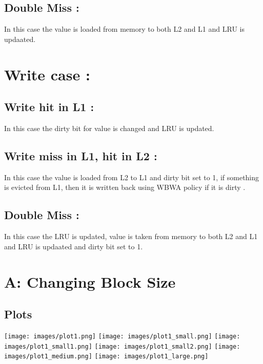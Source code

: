 \documentclass[11pt]{scrartcl}
\begin{document}
\subsection{ Double Miss :}
In this case the value is loaded from memory to both L2 and L1 and LRU is updaated.
\section{ Write case :}
\subsection{ Write hit in L1 :}
In this case the dirty bit for value is changed and LRU is updated.
\subsection{ Write miss in L1, hit in L2 :}
In this case the value is loaded from L2 to L1 and dirty bit set to 1, if something is evicted from L1, then it is written back using WBWA policy if it is dirty .
\subsection{ Double Miss :}
In this case the LRU is updated, value is taken from memory to both L2 and L1 and LRU is updaated and dirty bit set to 1.
\section{ A: Changing Block Size }
\subsection{Plots}
\texttt{[image: images/plot1.png]}
\texttt{[image: images/plot1\_small.png]}
\texttt{[image: images/plot1\_small1.png]}
\texttt{[image: images/plot1\_small2.png]}
\texttt{[image: images/plot1\_medium.png]}
\texttt{[image: images/plot1\_large.png]}

\newpage
\end{document}
